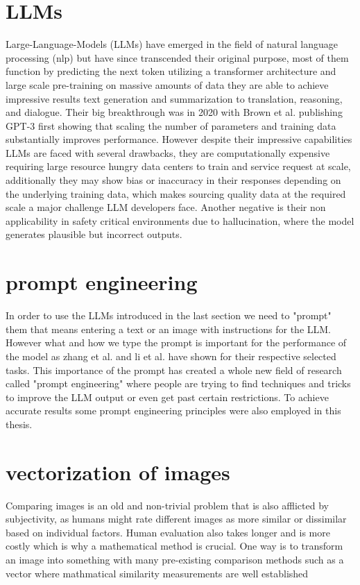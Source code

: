 \section{LLMs}
Large-Language-Models (LLMs) have emerged in the field of natural language processing (nlp) but have since transcended their original purpose, most of them function by predicting the next token utilizing a transformer architecture and large scale pre-training on massive amounts of data they are able to achieve impressive results text generation and summarization to translation, reasoning, and dialogue. Their big breakthrough was in 2020 with Brown et al. publishing GPT-3 \cite{brown2020languagemodelsfewshotlearners} first showing  that scaling the number of parameters and training data substantially improves performance. However despite their impressive capabilities LLMs are faced with several drawbacks, they are computationally expensive requiring large resource hungry data centers to train and service request at scale, additionally they may show bias or inaccuracy in their responses depending on the underlying training data, which makes sourcing quality data at the required scale a major challenge LLM developers face. Another negative is their non applicability in safety critical environments due to hallucination, where the model generates plausible but incorrect outputs.

\section{prompt engineering}
In order to use the LLMs introduced in the last section we need to "prompt" them that means entering a text or an image with instructions for the LLM. However what and how we type the prompt is important for the performance of the model as zhang et al. \cite{zhang2025understandingrelationshippromptsresponse} and li et al. \cite{li2024effectsdifferentpromptsquality} have shown for their respective selected tasks. This importance of the prompt has created a whole new field of research called "prompt engineering" where people are trying to find techniques and tricks to improve the LLM output or even get past certain restrictions. 
To achieve accurate results some prompt engineering principles were also employed in this thesis.

\section{vectorization of images}
Comparing images is an old and non-trivial problem that is also afflicted by subjectivity, as humans might rate different images as more similar or dissimilar based on individual factors. Human evaluation also takes longer and is more costly which is why a mathematical method is crucial. 
One way is to transform an image into something with many pre-existing comparison methods such as a vector where mathmatical similarity measurements are well established 


